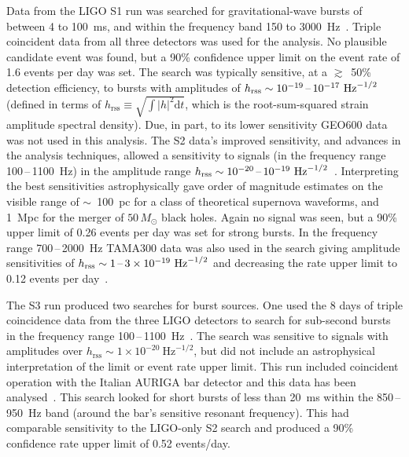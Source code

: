 Data from the LIGO S1 run was searched for gravitational-wave bursts of between
4 to 100~ms, and within the frequency band 150 to 3000~Hz~\cite{Abbott:2004b}.
Triple coincident data from all three detectors was used for the analysis. No
plausible candidate event was found, but a 90\% confidence upper limit on the
event rate of 1.6 events per day was set. The search was typically sensitive, at
a $\gtrsim$~50\% detection efficiency, to bursts with amplitudes of
$h_{\mathrm{rss}}\sim10^{-19}\mbox{\,--\,}10^{-17} \mathrm{\ Hz}^{-1/2}$ (defined in
terms of $h_{\mathrm{rss}} \equiv \sqrt{\int|h|^2 \mathrm{d}t}$, which is the root-sum-squared strain
amplitude spectral density). Due, in part, to its lower sensitivity GEO600 data
was not used in this analysis. The S2 data's improved sensitivity, and advances
in the analysis techniques, allowed a sensitivity to signals (in the frequency
range 100\,--\,1100~Hz) in the amplitude range
$h_{\mathrm{rss}}\sim10^{-20}\mbox{\,--\,}10^{-19}
\mathrm{\ Hz}^{-1/2}$~\cite{Abbott:2005a}. Interpreting the best
sensitivities astrophysically gave order of magnitude estimates on the
visible range of $\sim$~100~pc for a class of theoretical supernova waveforms,
and 1~Mpc for the merger of $50\,M_{\odot}$ black holes. Again no signal
was seen, but a 90\% upper limit of 0.26 events per day was set for strong
bursts. In the frequency range 700\,--\,2000~Hz TAMA300 data was also used in the
search giving amplitude sensitivities of
$h_{\mathrm{rss}}\sim1\mbox{\,--\,}3\times10^{-19}
\mathrm{\ Hz}^{-1/2}$ and decreasing the rate upper limit to 0.12
events per day~\cite{Abbott:2005c}.


The S3 run produced two searches for burst sources. One used the 8 days of
triple coincidence data from the three LIGO detectors to search for sub-second
bursts in the frequency range 100\,--\,1100~Hz~\cite{Abbott:2006a}. The search was
sensitive to signals with amplitudes over
$h_{\mathrm{rss}}\sim1\times10^{-20}\mathrm{\ Hz}^{-1/2}$, but did not
include an astrophysical interpretation of the limit or event rate
upper limit. This run included coincident operation with the Italian
AURIGA bar detector and this data has been
analysed~\cite{Baggio:2008}. This search looked for short bursts of
less than 20~ms within the 850\,--\,950~Hz band (around the bar's
sensitive resonant frequency). This had comparable sensitivity to the
LIGO-only S2 search and produced a 90\% confidence rate upper limit of
0.52 events/day.


